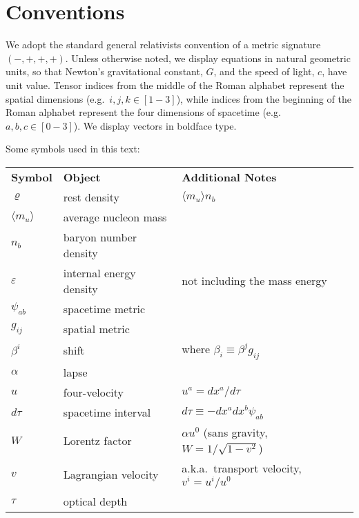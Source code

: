 
\section*{Conventions}
\label{sec:conventions}

We adopt the standard general relativists convention of a metric signature
$(-,+,+,+)$.
Unless otherwise noted, we display equations in natural geometric units, so that
Newton's gravitational constant, $G$, and the speed of light, $c$, have unit
value.
Tensor indices from the middle of the Roman alphabet represent the spatial
dimensions (e.g.\ $i,j,k\in[1-3]$), while indices from the beginning of the Roman
alphabet represent the four dimensions of spacetime (e.g.\ $a,b,c\in[0-3]$).
We display vectors in boldface type.

Some symbols used in this text:

\begin{tabular}{lll}
  \textbf{Symbol}       & \textbf{Object}           & \textbf{Additional Notes} \\
  $\varrho$             & rest density              & $\langle m_u \rangle n_b $ \\
  $\langle m_u \rangle$ & average nucleon mass      & \\
  $n_b$                 & baryon number density     & \\
  $\varepsilon$         & internal energy density   & not including the mass energy \\
  $\psi_{ab}$           & spacetime metric          & \\
  $g_{ij}$              & spatial metric            & \\
  $\beta^i$             & shift                     & where $\beta_i \equiv \beta^j g_{ij}$ \\
  $\alpha$              & lapse                     & \\
  $u$                   & four-velocity             & $u^a=dx^a/d\tau$ \\
  $d\tau$               & spacetime interval        & $d\tau\equiv-dx^a dx^b \psi_{ab}$ \\
  $W$                   & Lorentz factor            & $\alpha u^0$ (sans gravity, $W=1/\sqrt{1-v^2}$) \\
  $v$                   & Lagrangian velocity       & a.k.a.\ transport velocity, $v^i=u^i/u^0$ \\
  $\tau$                & optical depth             & \\
\end{tabular}

